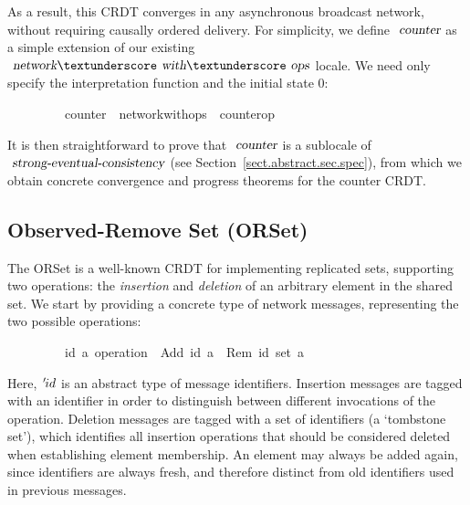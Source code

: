As a result, this CRDT converges in any asynchronous broadcast network, without requiring causally ordered delivery.
For simplicity, we define $\isa{counter}$ as a simple extension of our existing $\isa{network}{\isacharunderscore}\isa{with}{\isacharunderscore}\isa{ops}$ locale.
We need only specify the interpretation function and the initial state 0:
\vspace{0.35em}
\begin{isabellebody}
\ \ \ \ \ \ \ \ \ counter\ {\isacharequal}\ network{\isacharunderscore}with{\isacharunderscore}ops\ {\isacharunderscore}\ counter{\isacharunderscore}op\ {}
\end{isabellebody}
\vspace{0.35em}
It is then straightforward to prove that $\isa{counter}$ is a sublocale of $\isa{strong-eventual-consistency}$ (see Section~\ref{sect.abstract.sec.spec}), from which we obtain concrete convergence and progress theorems for the counter CRDT.

\subsection{Observed-Remove Set (ORSet)}
\label{subsect.orset}

The ORSet is a well-known CRDT for implementing replicated sets, supporting two operations: the \emph{insertion} and \emph{deletion} of an arbitrary element in the shared set.
We start by providing a concrete type of network messages, representing the two possible operations:
\vspace{0.35em}
\begin{isabellebody}
\ \ \ \ \ \ \ \ \ {\isacharparenleft}{\isacharprime}id{\isacharcomma}\ {\isacharprime}a{\isacharparenright}\ operation\ {\isacharequal}\ Add\ {\isachardoublequoteopen}{\isacharprime}id{\isachardoublequoteclose}\ {\isachardoublequoteopen}{\isacharprime}a{\isachardoublequoteclose}\ {\isacharbar}\ Rem\ {\isachardoublequoteopen}{\isacharparenleft}{\isacharprime}id\ set{\isacharparenright}{\isachardoublequoteclose}\ {\isachardoublequoteopen}{\isacharprime}a{\isachardoublequoteclose}
\end{isabellebody}
\vspace{0.35em}

\noindent Here, ${\emph{$\mskip2mu{'}\mskip-2mu$}}id$ is an abstract type of message identifiers.
Insertion messages are tagged with an identifier in order to distinguish between different invocations of the operation.
Deletion messages are tagged with a set of identifiers (a `tombstone set'), which identifies all insertion operations that should be considered deleted when establishing element membership.
An element may always be added again, since identifiers are always fresh, and therefore distinct from old identifiers used in previous messages.


